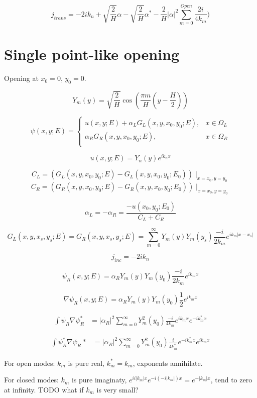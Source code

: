 \documentclass[12pt, a4paper]{article}
\begin{document}
$$j_{trans} = -2 i k_n + \sqrt{\frac{2}{H}} \alpha - \sqrt{\frac{2}{H}} \alpha^* - \frac  {2}{H}|\alpha|^2 \sum_{m = 0}^{Open} \frac{2i}{4 k_m})$$

\section{Single point-like opening}
Opening at $x_0 = 0$, $y_0 = 0$.

$$Y_m(y) = \sqrt{\frac{2}{H}} \cos(\frac{\pi m}{H} (y - \frac{H}{2}))$$

$$\psi(x, y; E) =
\begin{cases}
u(x, y; E) + \alpha_L G_L(x, y, x_0, y_0; E), & x \in \Omega_L \\
\alpha_R G_R(x, y, x_0, y_0; E), & x \in \Omega_R \\
\end{cases}$$

$$u(x, y; E) = Y_n(y) e^{i k_n x}$$

$$C_L = (G_L(x, y, x_0, y_0; E) - G_L(x, y, x_0, y_0; E_0))\mid_{x = x_0, y = y_0}$$
$$C_R = (G_R(x, y, x_0, y_0; E) - G_R(x, y, x_0, y_0; E_0))\mid_{x = x_0, y = y_0}$$

$$\alpha_L = -\alpha_R = \frac{-u(x_0, y_0; E_0)}{C_L + C_R}$$

$$G_L(x, y, x_s, y_s; E) = G_R(x, y, x_s, y_s; E) = \sum\limits_{m = 0}^\infty Y_m(y) Y_m(y_s) \frac{-i}{2 k_m} e^{i k_m |x - x_s|}$$

$$j_{inc} = -2 i k_n$$


$$\psi_R(x, y; E) = \alpha_R Y_m(y) Y_m(y_0) \frac{-i}{2 k_m} e^{i k_m x}$$

$$\nabla \psi_R(x, y; E) = \alpha_R Y_m(y) Y_m(y_0) \frac{1}{2} e^{i k_m x}$$


\begin{align*}
\int \psi_R \nabla \psi_R^* &= |\alpha_R|^2 \sum\limits_{m = 0}^\infty Y_m^2(y_0) \frac{-i}{4 k_m} e^{i k_m x} e^{-i k_m^* x}
\end{align*}

\begin{align*}
\int \psi^*_R \nabla \psi_R* &= |\alpha_R|^2 \sum\limits_{m = 0}^\infty Y_m^2(y_0) \frac{i}{4 k_m^*} e^{-i k_m^* x} e^{i k_m x}
\end{align*}

For open modes: $k_m$ is pure real, $k_m^* = k_m$, exponents annihilate.

For closed modes: $k_m$ is pure imaginaty, $e^{i i |k_m| x} e^{-i (-i |k_m|) x} = e^{- |k_m| x}$, tend to zero at infinity. TODO what if $k_m$ is very small?
\end{document}
